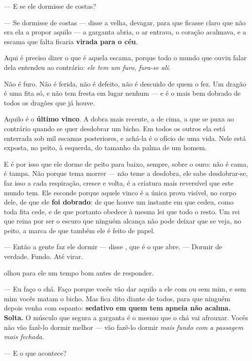 \documentclass[livro.tex]{subfiles}
\begin{document}
--- E se ele dormisse de costas?

--- Se dormisse de costas --- disse a velha, devagar, para que ficasse claro que não era ela a
propor aquilo --- a garganta abria, o ar entrava, o coração acalmava, e a escama que falta ficaria
\textbf{virada para o céu}.

\medskip

Aqui é preciso dizer o que é aquela escama, porque todo o mundo que ouviu falar dela entendeu ao
contrário: \emph{ele tem um furo, fura-se ali}.

Não é furo. Não é ferida, não é defeito, não é descuido de quem o fez. Um dragão é uma fita só, e
não tem fresta em lugar nenhum --- e \Ven é o mais bem dobrado de todos os dragões que já houve.

Aquilo é o \textbf{último vinco}. A dobra mais recente, a de cima, a que se puxa ao contrário
quando se quer desdobrar um bicho. Em todos os outros ela está enterrada sob mil escamas
posteriores, e achá-la é o ofício de uma vida. Nele está exposta, no peito, à esquerda, do
tamanho da palma de um homem.

E é por isso que ele dorme de peito para baixo, sempre, sobre o ouro: não é cama, é tampa. Não
porque tema morrer --- \Ven não teme a desdobra, ele sabe desdobrar-se, faz isso a cada
respiração, cresce e volta, é a criatura mais reversível que este mundo tem. Ele esconde porque
aquele vinco é a única prova visível, no corpo dele, de que ele \textbf{foi dobrado}: de que
houve um instante em que cedeu, como toda fita cede, e de que portanto obedece à mesma lei que
todo o resto. Um rei que reina por ser o escuro que ninguém alcança não pode deixar que se veja,
no peito, a marca de que também ele é feito de papel.

\medskip

--- Então a gente faz ele dormir --- disse \Ben , que é o que abre. --- Dormir de verdade. Fundo.
Até virar.

\Qui olhou para ele um tempo bom antes de responder.

--- Eu faço o chá. Faço porque vocês vão dar aquilo a ele com ou sem mim, e sem mim vocês matam o
bicho. Mas fica dito diante de todos, para que ninguém depois venha com espanto: \textbf{sedativo
em quem tem apneia não acalma. Solta.} O músculo que segura a garganta é o mesmo que o chá vai
afrouxar. Vocês não vão fazê-lo dormir melhor --- vão fazê-lo dormir \emph{mais fundo com a
passagem mais fechada}.

--- E o que acontece?
\end{document}
